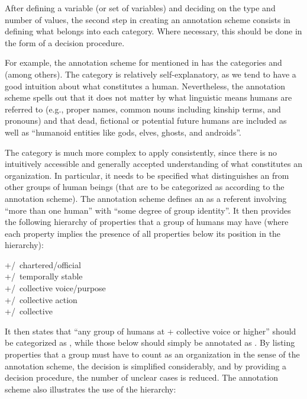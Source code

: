 After defining a variable (or set of variables) and deciding on the type and number of values, the second step in creating an annotation  scheme consists in defining what belongs into each category. Where necessary, this should be done in the form of a decision procedure.

For example, the annotation scheme for   mentioned in  \citep{garretson_coding_2004,zaenen_animacy_2004} has the categories  and  (among others). The category   is relatively self\hyp{}explanatory, as we tend to have a good intuition  about what constitutes a human. Nevertheless, the annotation  scheme spells out that it does not matter by what linguistic means humans  are referred to (e.g., proper names, common nouns  including kinship terms, and pronouns)  and that dead, fictional or potential future humans are included as well as ``humanoid entities like gods, elves, ghosts, and androids''.

The category  is much more complex to apply consistently, since there is no intuitively  accessible and generally accepted understanding of what constitutes an organization. In particular, it needs to be specified what distinguishes an  from other groups of human  beings (that are to be categorized  as  according to the annotation  scheme). The annotation  scheme defines an  as a referent involving ``more than one human'' with ``some degree of group identity''. It then provides the following hierarchy of properties that a group of humans  may have (where each property implies the presence of all properties below its position in the hierarchy):

\begin{exe}
\ex \noindent\parbox[t]{\linewidth}{+/\textminus\ chartered/official\\
+/\textminus\ temporally stable\\
+/\textminus\ collective voice/purpose\\
+/\textminus\ collective action\\
+/\textminus\ collective  }
\label{ex:animacyorg}
\end{exe}

It then states that ``any group of humans  at + collective voice or higher'' should be categorized  as , while those below should simply be annotated  as .  By listing properties that a group must have to count as an organization in the sense of the annotation scheme, the decision is simplified considerably, and by providing a decision procedure, the number of unclear cases is reduced. The annotation  scheme also illustrates the use of the hierarchy:

